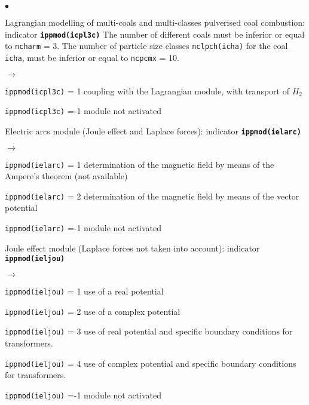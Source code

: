 {{\begin{list}{$\bullet$}{}
        \item Lagrangian modelling of multi-coals and
             multi-classes pulverised coal combustion:
                 indicator {\bf \tt ippmod(icpl3c)}
              The number of different coals must be inferior or equal to
              \texttt{ncharm} = 3. The number of particle size
             classes \texttt{nclpch(icha)} for the coal
             \texttt{icha}, must be inferior or equal to
             \texttt{ncpcmx} = 10.
         \begin{list}{$\rightarrow$}{}
                \item \texttt{ippmod(icpl3c)} = 1 coupling with the Lagrangian
                      module, with transport of $H_2$
                \item \texttt{ippmod(icpl3c)} =-1 module not activated
         \end{list}
       \item Electric arcs module (Joule effect and Laplace forces):
             indicator {\bf \tt ippmod(ielarc)}
        \begin{list}{$\rightarrow$}{}
               \item \texttt{ippmod(ielarc)} = 1 determination of the magnetic field by
                     means of the Ampere's theorem (not available)
               \item \texttt{ippmod(ielarc)} = 2 determination of the magnetic
                     field by means of the vector potential
               \item \texttt{ippmod(ielarc)} =-1 module not activated
         \end{list}
       \item Joule effect module (Laplace forces not taken into account):
             indicator {\bf \tt ippmod(ieljou)}
        \begin{list}{$\rightarrow$}{}
               \item \texttt{ippmod(ieljou)} = 1 use of a real potential
               \item \texttt{ippmod(ieljou)} = 2 use of a complex potential
               \item \texttt{ippmod(ieljou)} = 3 use of real potential and specific boundary conditions for transformers.
               \item \texttt{ippmod(ieljou)} = 4 use of complex potential and specific boundary conditions for transformers.
               \item \texttt{ippmod(ieljou)} =-1 module not activated

\end{list}
\end{list}}}
